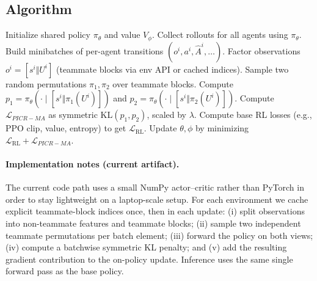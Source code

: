 \documentclass[nohyperref]{article}
\newcommand{\method}{PICR-MA} %
\begin{document}
\subsection{Algorithm}
\begin{algorithm}[H]
\caption{\method\ added to any decentralized learner (e.g., IPPO)}
\label{alg:picr}
\begin{algorithmic}[1]
\STATE Initialize shared policy $\pi_\theta$ and value $V_\phi$.
  \STATE Collect rollouts for all agents using $\pi_\theta$.
  \STATE Build minibatches of per-agent transitions $(o^i,a^i,\hat{A}^i,\ldots)$.
    \STATE Factor observations $o^i = [s^i\Vert U^i]$ (teammate blocks via env API or cached indices).
    \STATE Sample two random permutations $\pi_1,\pi_2$ over teammate blocks.
    \STATE Compute $p_1 = \pi_\theta(\cdot\mid[s^i\Vert\pi_1(U^i)])$ and $p_2 = \pi_\theta(\cdot\mid[s^i\Vert\pi_2(U^i)])$.
    \STATE Compute $\mathcal{L}_{\method}$ as symmetric KL$(p_1, p_2)$, scaled by $\lambda$.
    \STATE Compute base RL losses (e.g., PPO clip, value, entropy) to get $\mathcal{L}_{\text{RL}}$.
    \STATE Update $\theta,\phi$ by minimizing $\mathcal{L}_{\text{RL}} + \mathcal{L}_{\method}$.
  \ENDFOR
\ENDFOR
\end{algorithmic}
\end{algorithm}

\paragraph{Implementation notes (current artifact).} The current code path uses a small NumPy actor--critic rather than PyTorch in order to stay lightweight on a laptop-scale setup. For each environment we cache explicit teammate-block indices once, then in each update: (i) split observations into non-teammate features and teammate blocks; (ii) sample two independent teammate permutations per batch element; (iii) forward the policy on both views; (iv) compute a batchwise symmetric KL penalty; and (v) add the resulting gradient contribution to the on-policy update. Inference uses the same single forward pass as the base policy.
\end{document}
